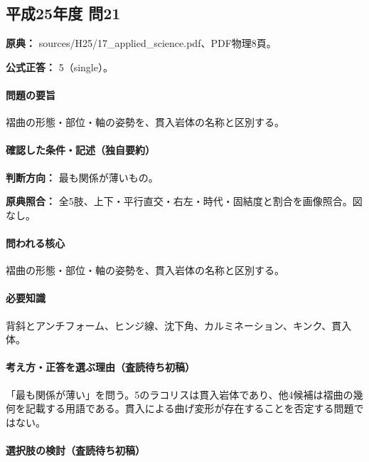 \subsection{平成25年度 問21}
\label{q:h25-reg-applied-21}

\noindent\textbf{原典：} sources/H25/17\_applied\_science.pdf、PDF物理8頁。

\textbf{公式正答：} 5（single）。

\paragraph{問題の要旨} 褶曲の形態・部位・軸の姿勢を、貫入岩体の名称と区別する。

\paragraph{確認した条件・記述（独自要約）}\mbox{}\par

\noindent\textbf{判断方向：} 最も関係が薄いもの。\par

\noindent\textbf{原典照合：} 全5肢、上下・平行直交・右左・時代・固結度と割合を画像照合。図なし。\par

\paragraph{問われる核心} 褶曲の形態・部位・軸の姿勢を、貫入岩体の名称と区別する。

\paragraph{必要知識} 背斜とアンチフォーム、ヒンジ線、沈下角、カルミネーション、キンク、貫入体。

\paragraph{考え方・正答を選ぶ理由（査読待ち初稿）} 「最も関係が薄い」を問う。5のラコリスは貫入岩体であり、他4候補は褶曲の幾何を記載する用語である。貫入による曲げ変形が存在することを否定する問題ではない。

\paragraph{選択肢の検討（査読待ち初稿）}\mbox{}\par

